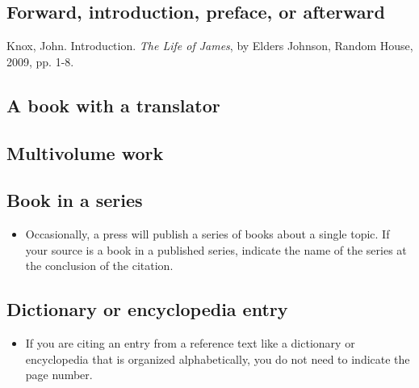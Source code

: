 {

\subsection{Forward, introduction, preface, or afterward}

{Knox, John. Introduction. \emph{The Life of James}, by Elders Johnson, Random House, 2009, pp. 1-8.}



\subsection{A book with a translator} 

\subsection{Multivolume work}


\subsection{Book in a series}



\begin{itemize}\item Occasionally, a press will publish a series of books about a single topic. If your source is a book in a published series, indicate the name of the series at the conclusion of the citation. \end{itemize}

\subsection{Dictionary or encyclopedia entry}


\begin{itemize}\item If you are citing an entry from a reference text like a dictionary or encyclopedia that is organized alphabetically, you do not need to indicate the page number.\end{itemize}

}
